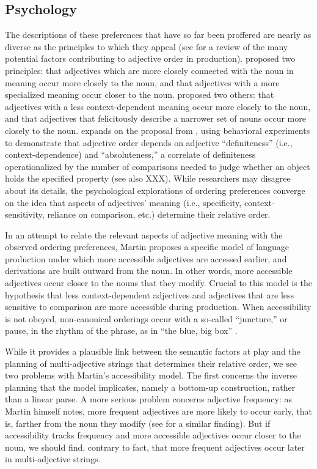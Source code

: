 \documentclass{pnastwo}
\begin{document}
\begin{article}
\subsection{Psychology}
The descriptions of these preferences that have so far been proffered are nearly as diverse as the principles to which they appeal (see \cite{wulff2003} for a review of the many potential factors contributing to adjective order in production). \cite{sweet1898} proposed two principles: that adjectives which are more closely connected with the noun in meaning occur more closely to the noun, and that adjectives with a more specialized meaning occur closer to the noun. \cite{ziff1960} proposed two others: that adjectives with a less context-dependent meaning occur more closely to the noun, and that adjectives that felicitously describe a narrower set of nouns occur more closely to the noun. \cite{martin1969determinants} expands on the proposal from \cite{ziff1960}, using behavioral experiments to demonstrate that adjective order depends on adjective ``definiteness'' (i.e., context-dependence) and ``absoluteness,'' a correlate of definiteness operationalized by the number of comparisons needed to judge whether an object holds the specified property (see also \cite{kemmereretal2009} XXX).
While researchers may disagree about its details, the psychological explorations of ordering preferences converge on the idea that aspects of  adjectives' meaning (i.e., specificity, context-sensitivity, reliance on comparison, etc.) determine their relative order.

In an attempt to relate the relevant aspects of adjective meaning with the observed ordering preferences, Martin \cite{martin1969competence,martin1969determinants} proposes a specific model of language production under which more accessible adjectives are accessed earlier, and derivations are built outward from the noun. In other words, more accessible adjectives occur closer to the nouns that they modify. Crucial to this model is the hypothesis that less context-dependent adjectives and adjectives that are less sensitive to comparison are more accessible during production. When accessibility is not obeyed, non-canonical orderings occur with a so-called ``juncture,'' or pause, in the rhythm of the phrase, as in ``the blue, big box'' \cite{martin1970}.

While it provides a plausible link between the semantic factors at play and the planning of multi-adjective strings that determines their relative order, we see two problems with Martin's accessibility model. The first concerns the inverse planning that the model implicates, namely a bottom-up construction, rather than a linear parse. A more serious problem concerns adjective frequency: as Martin himself notes, more frequent adjectives are more likely to occur early, that is, farther from the noun they modify (see  \cite{wulff2003} for a similar finding).  But if accessibility tracks frequency and more accessible adjectives occur closer to the noun, we should find, contrary to fact, that more frequent adjectives occur later in multi-adjective strings.


\end{article}
\end{document}
